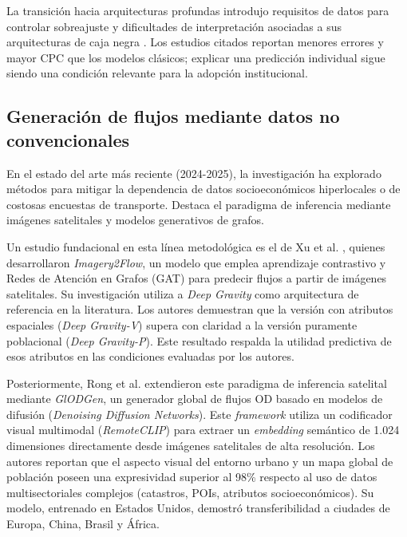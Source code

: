 La transición hacia arquitecturas profundas introdujo requisitos de datos para controlar sobreajuste y dificultades de interpretación asociadas a sus arquitecturas de caja negra \cite{liu2024interdisciplinary}. Los estudios citados reportan menores errores y mayor CPC que los modelos clásicos; explicar una predicción individual sigue siendo una condición relevante para la adopción institucional.

\subsection{Generación de flujos mediante datos no convencionales}
\label{sec:flujos_no_convencionales}

En el estado del arte más reciente (2024-2025), la investigación ha explorado métodos para mitigar la dependencia de datos socioeconómicos hiperlocales o de costosas encuestas de transporte. Destaca el paradigma de inferencia mediante imágenes satelitales y modelos generativos de grafos.

Un estudio fundacional en esta línea metodológica es el de Xu et al. \cite{xu2025predicting}, quienes desarrollaron \textit{Imagery2Flow}, un modelo que emplea aprendizaje contrastivo y Redes de Atención en Grafos (GAT) para predecir flujos a partir de imágenes satelitales. Su investigación utiliza a \textit{Deep Gravity} como arquitectura de referencia en la literatura. Los autores demuestran que la versión con atributos espaciales (\textit{Deep Gravity-V}) supera con claridad a la versión puramente poblacional (\textit{Deep Gravity-P}). Este resultado respalda la utilidad predictiva de esos atributos en las condiciones evaluadas por los autores.

Posteriormente, Rong et al. \cite{rong2026satellites} extendieron este paradigma de inferencia satelital mediante \textit{GlODGen}, un generador global de flujos OD basado en modelos de difusión (\textit{Denoising Diffusion Networks}). Este \textit{framework} utiliza un codificador visual multimodal (\textit{RemoteCLIP}) para extraer un \textit{embedding} semántico de 1.024 dimensiones directamente desde imágenes satelitales de alta resolución. Los autores reportan que el aspecto visual del entorno urbano y un mapa global de población poseen una expresividad superior al 98\% respecto al uso de datos multisectoriales complejos (catastros, POIs, atributos socioeconómicos). Su modelo, entrenado en Estados Unidos, demostró transferibilidad a ciudades de Europa, China, Brasil y África.

